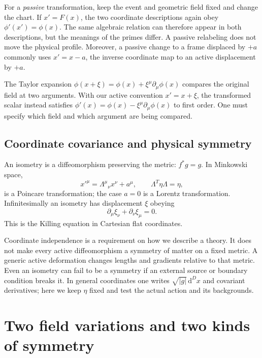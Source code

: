 \documentclass[11pt]{article}
\newcommand{\dd}{\mathrm{d}}
\begin{document}
For a \emph{passive} transformation, keep the event and geometric field
fixed and change the chart. If \(x'=F(x)\), the two coordinate descriptions
again obey \(\phi'(x')=\phi(x)\). The same algebraic relation can therefore
appear in both descriptions, but the meanings of the primes differ.
A passive relabeling does not move the physical profile. Moreover, a passive
change to a frame displaced by \(+a\) commonly uses \(x'=x-a\), the inverse
coordinate map to an active displacement by \(+a\).

\begin{warningbox}
The Taylor expansion \(\phi(x+\xi)=\phi(x)+\xi^\mu\partial_\mu\phi(x)\)
compares the original field at two arguments. With our active convention
\(x'=x+\xi\), the transformed scalar instead satisfies
\(\phi'(x)=\phi(x)-\xi^\mu\partial_\mu\phi(x)\) to first order.
One must specify which field and which argument are being compared.
\end{warningbox}

\subsection{Coordinate covariance and physical symmetry}
An isometry is a diffeomorphism preserving the metric:
\(f^*g=g\). In Minkowski space,
\begin{equation}
x'^\mu=\Lambda^\mu{}_{\nu}x^\nu+a^\mu,
\qquad \Lambda^T\eta\Lambda=\eta,
\end{equation}
is a Poincare transformation; the case \(a=0\) is a Lorentz transformation.
Infinitesimally an isometry has displacement \(\xi\) obeying
\begin{equation}
\partial_\mu\xi_\nu+\partial_\nu\xi_\mu=0.
\label{eq:Killing}
\end{equation}
This is the Killing equation in Cartesian flat coordinates.

Coordinate independence is a requirement on how we describe a theory.
It does not make every active diffeomorphism a symmetry of matter on a
fixed metric. A generic active deformation changes lengths and gradients
relative to that metric. Even an isometry can fail to be a symmetry if
an external source or boundary condition breaks it. In general coordinates
one writes \(\sqrt{|g|}\,\dd^D x\) and covariant derivatives; here we keep
\(\eta\) fixed and test the actual action and its backgrounds.

\section{Two field variations and two kinds of symmetry}
\end{document}
